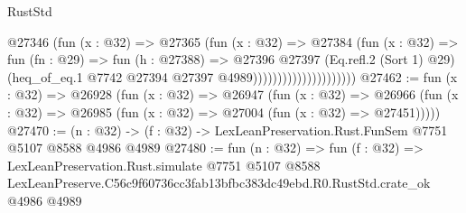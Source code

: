 \begin{lexlean}{RustStd}
\begin{coremodule}
                                    @27346
                                      (fun (x : @32) =>
                                      @27365
                                        (fun (x : @32) =>
                                        @27384
                                          (fun (x : @32) =>
                                          fun (fn : @29) =>
                                          fun (h : @27388) =>
                                          @27396
                                            @27397
                                            (Eq.refl.{2} (Sort 1) @29)
                                            (heq_of_eq.{1}
                                              @7742
                                              @27394
                                              @27397
                                              @4989)))))))))))))))))))))
@27462 := fun (x : @32) =>
  @26928
    (fun (x : @32) =>
    @26947
      (fun (x : @32) =>
      @26966 (fun (x : @32) => @26985 (fun (x : @32) => @27004 (fun (x : @32) => @27451)))))
@27470 := (n : @32) -> (f : @32) -> LexLeanPreservation.Rust.FunSem @7751 @5107 @8588 @4986 @4989
@27480 := fun (n : @32) =>
  fun (f : @32) =>
  LexLeanPreservation.Rust.simulate
    @7751
    @5107
    @8588
    LexLeanPreserve.C56c9f60736cc3fab13bfbc383dc49ebd.R0.RustStd.crate_ok
    @4986
    @4989
\end{coremodule}
\end{lexlean}
